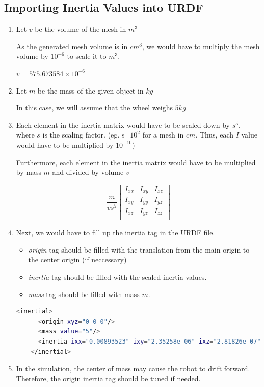 \documentclass[11pt]{article}
\begin{document}
\subsection{Importing Inertia Values into URDF}
\begin{enumerate}
 \item {
       Let $v$ be the volume of the mesh in $m^3$

       As the generated mesh volume is in ${cm}^3$, we would have to multiply the mesh volume by $10^{-6}$ to scale it to $m^3$.

       $v=575.673584\times10^{-6}$
       }
 \item {
       Let $m$ be the mass of the given object in $kg$

       In this case, we will assume that the wheel weighs $5kg$
       }
 \item {

       Each element in the inertia matrix would have to be scaled down by $s^5$, where $s$ is the scaling factor.
       (eg. s=$10^2$ for a mesh in $cm$. Thus, each $I$ value would have to be multiplied by $10^{-10}$)

       Furthermore, each element in the inertia matrix would have to be multiplied by mass $m$ and divided by volume $v$

       $$
        \frac{m}{vs^5}
        \begin{bmatrix}
         I_{xx} & I_{xy} & I_{xz} \\
         I_{xy} & I_{yy} & I_{yz} \\
         I_{xz} & I_{yz} & I_{zz} \\
        \end{bmatrix}
       $$
       }
 \item{
       Next, we would have to fill up the inertia tag in the URDF file.
       \begin{itemize}
        \item { \emph{origin} tag should be filled with the translation from the main origin to the center origin (if neccessary)}
        \item { \emph{inertia} tag should be filled with the scaled inertia values. }
        \item { \emph{mass} tag should be filled with mass $m$.}
       \end{itemize}
       \begin{lstlisting}[language=bash]
    <inertial>
      <origin xyz="0 0 0"/>
      <mass value="5"/>
      <inertia ixx="0.00893523" ixy="2.35258e-06" ixz="2.81826e-07" iyy="0.00586446" iyz="-3.54454e-07" izz="0.00586635"/>
    </inertial>
       \end{lstlisting}
       }
 \item {
       In the simulation, the center of mass may cause the robot to drift forward. Therefore, the origin inertia tag should be tuned if needed.
       }
\end{enumerate}
\end{document}

